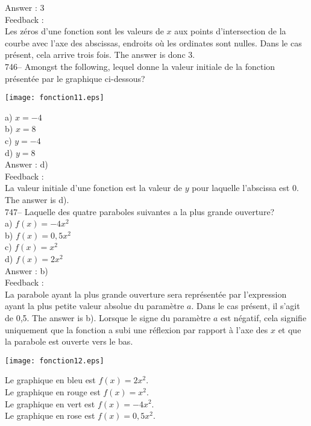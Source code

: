 \documentclass[letterpaper, 12pt]{article}
\begin{document}
Answer : 3\\

Feedback : \\
Les z\'eros d'une fonction sont les valeurs de $x$ aux points d'intersection
de la courbe avec l'axe des abscissas, endroits o\`u les ordinates sont
nulles.  Dans le cas pr\'esent, cela arrive trois fois.  The answer is
donc 3.\\

746-- Amongst the following, lequel donne la valeur initiale de la
fonction pr\'esent\'ee par le graphique ci-dessous?\\
    \begin{center}
    \texttt{[image: fonction11.eps]}
    \end{center}
a) $x=-4$\\
b) $x=8$\\
c) $y=-4$\\
d) $y=8$\\

Answer : d)\\

Feedback : \\
La valeur initiale d'une fonction est la valeur de $y$ pour laquelle
l'abscissa est 0.  The answer is d).\\

747-- Laquelle des quatre paraboles suivantes a la plus grande ouverture?\\
a) $f(x)=-4x^{2}$\\
b) $f(x)=0,5x^{2}$\\
c) $f(x)=x^{2}$\\
d) $f(x)=2x^{2}$\\

Answer : b)\\

Feedback : \\
La parabole ayant la plus grande ouverture sera repr\'esent\'ee par
l'expression ayant la plus petite valeur absolue du param\`etre $a$. Dans le
cas pr\'esent, il s'agit de 0,5. The answer is b). Lorsque le signe
du param\`etre $a$ est n\'egatif, cela signifie uniquement que la fonction a
subi une r\'eflexion par rapport \`a l'axe des $x$ et que la parabole est
ouverte vers le bas.\\
    \begin{center}
    \texttt{[image: fonction12.eps]}
    \end{center}
Le graphique en bleu est $f(x)=2x^{2}$.\\
Le graphique en rouge est $f(x)=x^{2}$.\\
Le graphique en vert est $f(x)=-4x^{2}$.\\
Le graphique en rose est $f(x)=0,5x^{2}$.\\
\end{document}
